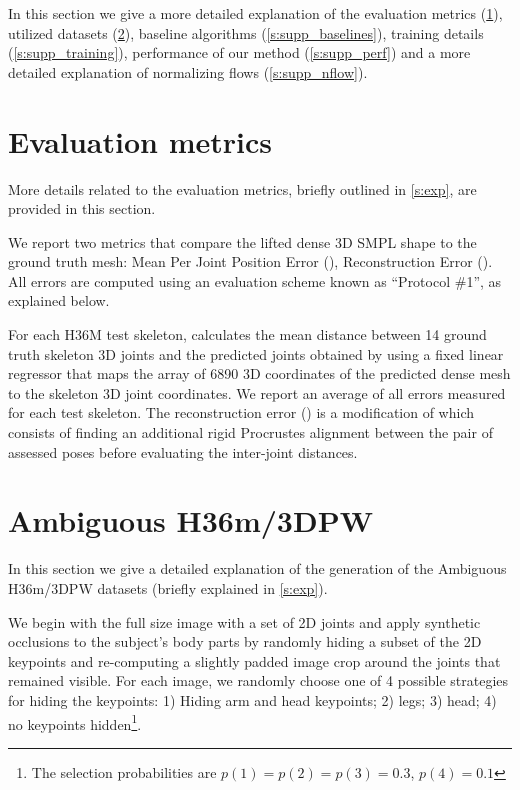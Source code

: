 \setcounter{page}{1}

\makesuptitle

In this section we give a more detailed explanation of the 
evaluation metrics (\cref{s:supp_eval_metrics}), 
utilized datasets (\cref{s:supp_datasets}), 
baseline algorithms (\cref{s:supp_baselines}), 
training details (\cref{s:supp_training}), 
performance of our method (\cref{s:supp_perf}) and a more detailed explanation of normalizing flows (\cref{s:supp_nflow}).

\section{Evaluation metrics} \label{s:supp_eval_metrics}

More details related to the evaluation metrics, briefly outlined in \cref{s:exp}, are provided in this section.

We report two metrics that compare the lifted dense 3D SMPL shape to the ground truth mesh: Mean Per Joint Position Error (\textbf{\MPJPE}), Reconstruction Error (\textbf{\RE}).
All errors are computed using an evaluation scheme known as ``Protocol \#1'', as explained below.

For each H36M test skeleton, \MPJPE calculates the mean distance between 14 ground truth skeleton 3D joints and the predicted joints obtained by using a fixed linear regressor that maps the array of 6890 3D coordinates of the predicted dense mesh to the skeleton 3D joint coordinates.
We report an average of all \MPJPE errors measured for each test skeleton.
The reconstruction error (\RE) is a modification of \MPJPE which consists of finding an additional rigid Procrustes alignment between the pair of assessed poses before evaluating the inter-joint distances.

\section{Ambiguous H36m/3DPW} \label{s:supp_datasets}

In this section we give a detailed explanation of the generation of the Ambiguous H36m/3DPW datasets (briefly explained in \cref{s:exp}).

We begin with the full size image with a set of 2D joints and apply synthetic occlusions to the subject's body parts by randomly hiding a subset of the 2D keypoints and re-computing a slightly padded image crop around the joints that remained visible. 
For each image, we randomly choose one of 4 possible strategies for hiding the keypoints: 1) Hiding arm and head keypoints; 2) legs; 3) head; 4) no keypoints hidden\footnote{The selection probabilities are $p(1)=p(2)=p(3)=0.3$, $p(4)=0.1$}. 

